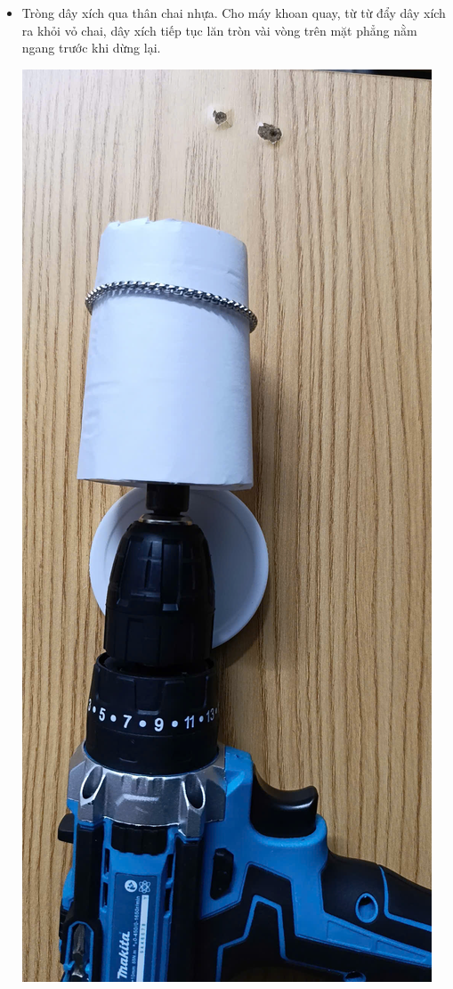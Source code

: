 {\begin{itemize}
\begin{itemize}
			\item Tròng dây xích qua thân chai nhựa. Cho máy khoan quay, từ từ đẩy dây xích ra khỏi vỏ chai, dây xích tiếp tục lăn tròn vài vòng trên mặt phẳng nằm ngang trước khi dừng lại.
			\begin{center}
				\includegraphics[scale=0.1, angle=-90]{figs/G10-BAI21-6}

\end{center}
\end{itemize}
\end{itemize}}

